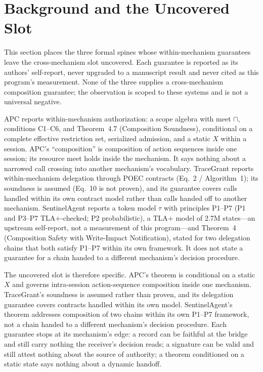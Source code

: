 \documentclass[sigconf,anonymous,nonacm]{acmart}
\begin{document}
\section{Background and the Uncovered Slot}

This section places the three formal spines whose within-mechanism guarantees leave the cross-mechanism slot uncovered. Each guarantee is reported as its authors' self-report, never upgraded to a manuscript result and never cited as this program's measurement. None of the three supplies a cross-mechanism composition guarantee; the observation is scoped to these systems and is not a universal negative.

APC \cite{apc} reports within-mechanism authorization: a scope algebra with meet $\sqcap$, conditions C1--C6, and Theorem~4.7 (Composition Soundness), conditional on a complete effective restriction set, serialized admission, and a static $X$ within a session. APC's ``composition'' is composition of action sequences inside one session; its resource meet holds inside the mechanism. It says nothing about a narrowed call crossing into another mechanism's vocabulary. TraceGrant \cite{tracegrant} reports within-mechanism delegation through POEC contracts (Eq.~2 / Algorithm~1); its soundness is assumed (Eq.~10 is not proven), and its guarantee covers calls handled within its own contract model rather than calls handed off to another mechanism. SentinelAgent \cite{sentinelagent} reports a token model $\tau$ with principles P1--P7 (P1 and P3--P7 TLA+-checked; P2 probabilistic), a TLA+ model of 2.7M states---an upstream self-report, not a measurement of this program---and Theorem~4 (Composition Safety with Write-Impact Notification), stated for two delegation chains that both satisfy P1--P7 within its own framework. It does not state a guarantee for a chain handed to a different mechanism's decision procedure.

The uncovered slot is therefore specific. APC's theorem is conditional on a static $X$ and governs intra-session action-sequence composition inside one mechanism. TraceGrant's soundness is assumed rather than proven, and its delegation guarantee covers contracts handled within its own model. SentinelAgent's theorem addresses composition of two chains within its own P1--P7 framework, not a chain handed to a different mechanism's decision procedure. Each guarantee stops at its mechanism's edge: a record can be faithful at the bridge and still carry nothing the receiver's decision reads; a signature can be valid and still attest nothing about the source of authority; a theorem conditioned on a static state says nothing about a dynamic handoff.
\end{document}
